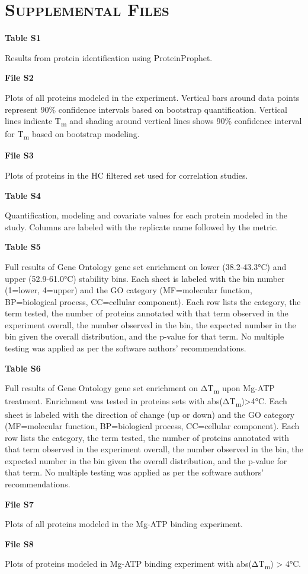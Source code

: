 \documentclass[11pt,letter]{article}\usepackage[]{graphicx}\usepackage[]{color}
\newcommand{\Tm}{T\textsubscript{m}}
\newcommand{\DeltaTm}{Δ\Tm}
\newcommand{\celsius}[1]{#1°C}
\begin{document}

\clearpage
\section*{\textsc{Supplemental Files}}

\textbf{Table S1}

Results from protein identification using ProteinProphet. 

\textbf{File S2}

Plots of all proteins modeled in the experiment. Vertical bars around data
points represent 90\% confidence intervals based on bootstrap quantification.
Vertical lines indicate \Tm{} and shading around vertical lines shows 90\%
confidence interval for \Tm{} based on bootstrap modeling.

\textbf{File S3}

Plots of proteins in the HC filtered set used for correlation
studies.

\textbf{Table S4}

Quantification, modeling and covariate values for each protein modeled in the
study. Columns are labeled with the replicate name followed by the metric.

\textbf{Table S5}

Full results of Gene Ontology gene set enrichment on lower
(38.2-43.3°C)
and upper
(52.9-61.0°C)
stability bins. Each sheet is labeled with the bin number (1=lower, 4=upper)
and the GO category (MF=molecular function, BP=biological process, CC=cellular
component). Each row lists the category, the term tested, the number of
proteins annotated with that term observed in the experiment overall, the
number observed in the bin, the expected number in the bin given the overall
distribution, and the p-value for that term. No multiple testing was applied
as per the software authors' recommendations. 

\textbf{Table S6}

Full results of Gene Ontology gene set enrichment on \DeltaTm{} upon Mg-ATP
treatment. Enrichment was tested in proteins sets with
abs(\DeltaTm{})>\celsius{4}.
Each sheet is labeled with the direction of change (up or down) 
and the GO category (MF=molecular function, BP=biological process, CC=cellular
component). Each row lists the category, the term tested, the number of
proteins annotated with that term observed in the experiment overall, the
number observed in the bin, the expected number in the bin given the overall
distribution, and the p-value for that term. No multiple testing was applied
as per the software authors' recommendations. 

\textbf{File S7}

Plots of all proteins modeled in the Mg-ATP binding experiment.

\textbf{File S8}

Plots of proteins modeled in Mg-ATP binding experiment with abs(\DeltaTm{})
> \celsius{4}.

\end{document}
